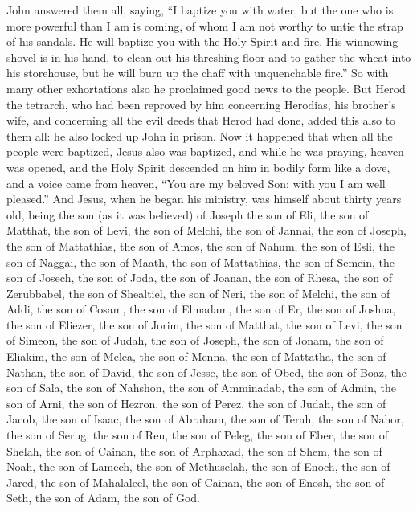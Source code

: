 \begin{biblechapter}
\verse John answered them all, saying, “I baptize you with water, but the one who is more powerful than I am is coming, of whom I am not worthy to untie the strap of his sandals. He will baptize you with the Holy Spirit and fire.
\verse His winnowing shovel is in his hand, to clean out his threshing floor and to gather the wheat into his storehouse, but he will burn up the chaff with unquenchable fire.”
\verse So with many other exhortations also he proclaimed good news to the people.
\verse But Herod the tetrarch, who had been reproved by him concerning Herodias, his brother’s wife, and concerning all the evil deeds that Herod had done,
\verse added this also to them all: he also locked up John in prison.
 Now it happened that when all the people were baptized, Jesus also was baptized, and while he was praying, heaven was opened,
\verse and the Holy Spirit descended on him in bodily form like a dove, and a voice came from heaven, “You are my beloved Son; with you I am well pleased.”
 And Jesus, when he began his ministry, was himself about thirty years old, being the son (as it was believed) of Joseph the son of Eli,
\verse the son of Matthat, the son of Levi, the son of Melchi, the son of Jannai, the son of Joseph,
\verse the son of Mattathias, the son of Amos, the son of Nahum, the son of Esli, the son of Naggai,
\verse the son of Maath, the son of Mattathias, the son of Semein, the son of Josech, the son of Joda,
\verse the son of Joanan, the son of Rhesa, the son of Zerubbabel, the son of Shealtiel, the son of Neri,
\verse the son of Melchi, the son of Addi, the son of Cosam, the son of Elmadam, the son of Er,
\verse the son of Joshua, the son of Eliezer, the son of Jorim, the son of Matthat, the son of Levi,
\verse the son of Simeon, the son of Judah, the son of Joseph, the son of Jonam, the son of Eliakim,
\verse the son of Melea, the son of Menna, the son of Mattatha, the son of Nathan, the son of David,
\verse the son of Jesse, the son of Obed, the son of Boaz, the son of Sala, the son of Nahshon,
\verse the son of Amminadab, the son of Admin, the son of Arni, the son of Hezron, the son of Perez, the son of Judah,
\verse the son of Jacob, the son of Isaac, the son of Abraham, the son of Terah, the son of Nahor,
\verse the son of Serug, the son of Reu, the son of Peleg, the son of Eber, the son of Shelah,
\verse the son of Cainan, the son of Arphaxad, the son of Shem, the son of Noah, the son of Lamech,
\verse the son of Methuselah, the son of Enoch, the son of Jared, the son of Mahalaleel, the son of Cainan,
\verse the son of Enosh, the son of Seth, the son of Adam, the son of God.
\end{biblechapter}

